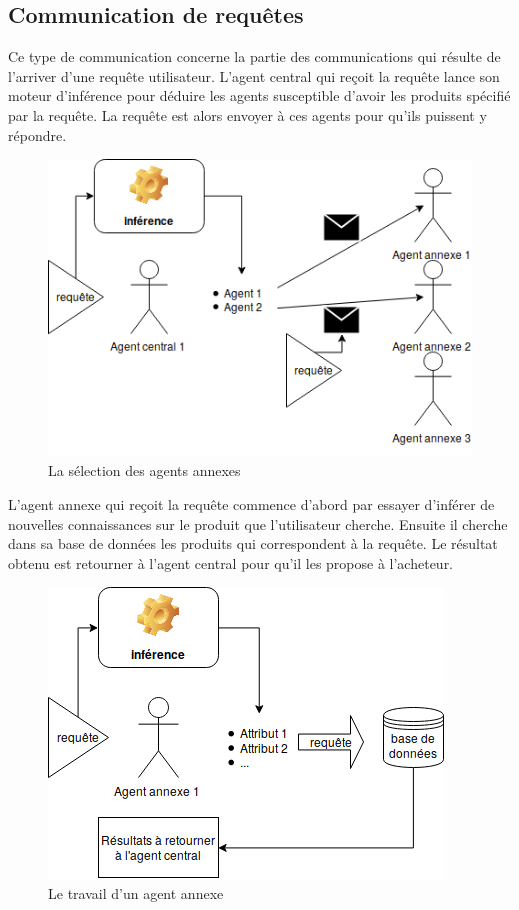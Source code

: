 \subsection{Communication de requêtes}
Ce type de communication concerne la partie des communications qui résulte de l’arriver d’une requête utilisateur. L’agent central qui reçoit la requête lance son moteur d’inférence pour déduire les agents susceptible d’avoir les produits spécifié par la requête. La requête est alors envoyer à ces agents pour qu’ils puissent y répondre.
\begin{figure}[H]
	\centering
	\includegraphics[scale=0.6]{imgs/annexeSelec.png}
	\caption{La sélection des agents annexes}
	\label{fig:annexeSelection}
\end{figure}
L'agent annexe qui reçoit la requête commence d’abord par essayer d’inférer de nouvelles connaissances sur le produit que l’utilisateur cherche. Ensuite il cherche dans sa base de données les produits qui correspondent à la requête. Le résultat obtenu est retourner à l’agent central pour qu’il les propose à l’acheteur.
\begin{figure}[H]
	\centering
	\includegraphics[scale=0.6]{imgs/annexeWork.png}
	\caption{Le travail d'un agent annexe}
	\label{fig:annexeWork}
\end{figure}

